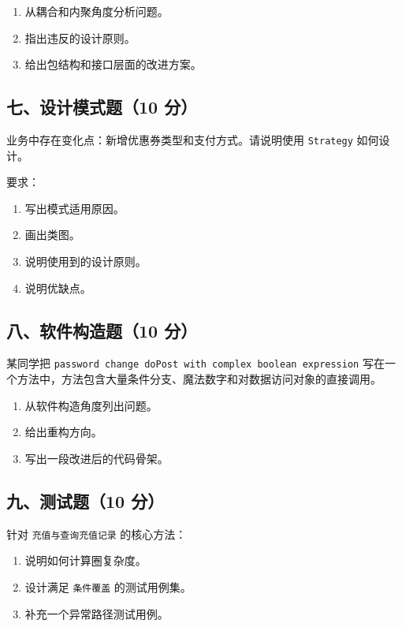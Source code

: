 \documentclass[UTF8,zihao=-4]{ctexart}
\begin{document}
\begin{enumerate}
\item 从耦合和内聚角度分析问题。
\item 指出违反的设计原则。
\item 给出包结构和接口层面的改进方案。
\end{enumerate}


\subsection{七、设计模式题（10 分）}


业务中存在变化点：新增优惠券类型和支付方式。请说明使用 \texttt{Strategy} 如何设计。


要求：


\begin{enumerate}
\item 写出模式适用原因。
\item 画出类图。
\item 说明使用到的设计原则。
\item 说明优缺点。
\end{enumerate}


\subsection{八、软件构造题（10 分）}


某同学把 \texttt{password change doPost with complex boolean expression} 写在一个方法中，方法包含大量条件分支、魔法数字和对数据访问对象的直接调用。


\begin{enumerate}
\item 从软件构造角度列出问题。
\item 给出重构方向。
\item 写出一段改进后的代码骨架。
\end{enumerate}


\subsection{九、测试题（10 分）}


针对 \texttt{充值与查询充值记录} 的核心方法：


\begin{enumerate}
\item 说明如何计算圈复杂度。
\item 设计满足 \texttt{条件覆盖} 的测试用例集。
\item 补充一个异常路径测试用例。
\end{enumerate}
\end{document}
